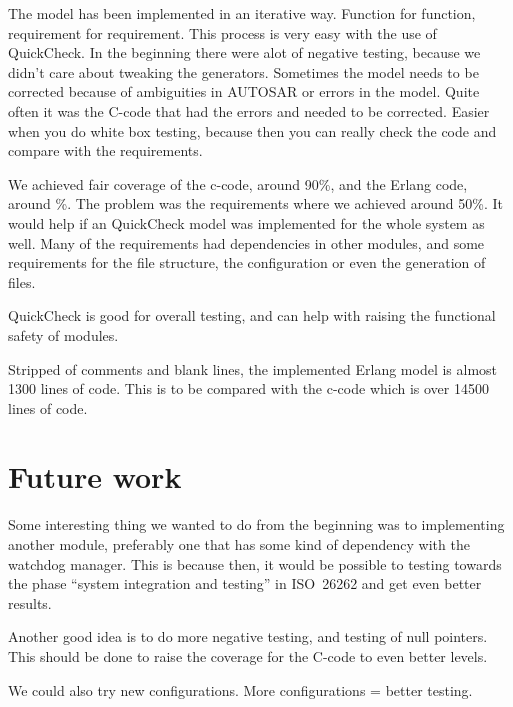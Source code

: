 
The model has been implemented in an iterative way. Function for function,
requirement for requirement. This process is very easy with the use of
QuickCheck.
In the beginning there were alot of negative testing, because we didn't care
about tweaking the generators.
Sometimes the model needs to be corrected because of ambiguities in AUTOSAR or
errors in the model. Quite often it was the C-code that had the errors and
needed to be corrected.
Easier when you do white box testing, because then you can really check the code
and compare with the requirements.

We achieved fair coverage of the c-code, around 90\%, and the Erlang code,
around \%. The problem was the requirements where we achieved around 50\%. It
would help if an QuickCheck model was implemented for the whole system as
well. Many of the requirements had dependencies in other modules, and some
requirements for the file structure, the configuration or even the generation of
files.

QuickCheck is good for overall testing, and can help with raising the functional
safety of modules.


Stripped of comments and blank lines, the implemented Erlang model is
almost 1300 lines of code. This is to be compared with the c-code
which is over 14500 lines of code.


\section{Future work}
Some interesting thing we wanted to do from the beginning was to implementing
another module, preferably one that has some kind of dependency with the
watchdog manager. This is because then, it would be possible to testing towards
the phase ``system integration and testing'' in ISO~26262 and get even better
results.

Another good idea is to do more negative testing, and testing of null
pointers. This should be done to raise the coverage for the C-code to even
better levels.

We could also try new configurations. More configurations = better testing.